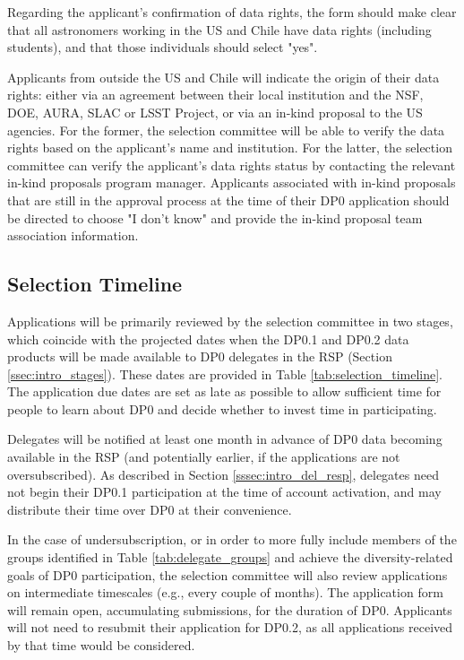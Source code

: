 \documentclass[DM,lsstdraft,authoryear,toc]{lsstdoc}
\begin{document}
Regarding the applicant's confirmation of data rights, the form should make clear that all astronomers working in the US and Chile have data rights (including students), and that those individuals should select "yes".

Applicants from outside the US and Chile will indicate the origin of their data rights: either via an agreement between their local institution and the NSF, DOE, AURA, SLAC or LSST Project, or via an in-kind proposal to the US agencies. 
For the former, the selection committee will be able to verify the data rights based on the applicant's name and institution.
For the latter, the selection committee can verify the applicant's data rights status by contacting the relevant in-kind proposals program manager.
Applicants associated with in-kind proposals that are still in the approval process at the time of their DP0 application should be directed to choose "I don't know" and provide the in-kind proposal team association information. 

\subsection{Selection Timeline}\label{ssec:sel_time}

Applications will be primarily reviewed by the selection committee in two stages, which coincide with the projected dates when the DP0.1 and DP0.2 data products will be made available to DP0 delegates in the RSP (Section \ref{ssec:intro_stages}).
These dates are provided in Table \ref{tab:selection_timeline}.
The application due dates are set as late as possible to allow sufficient time for people to learn about DP0 and decide whether to invest time in participating.

Delegates will be notified at least one month in advance of DP0 data becoming available in the RSP (and potentially earlier, if the applications are not oversubscribed).
As described in Section \ref{sssec:intro_del_resp}, delegates need not begin their DP0.1 participation at the time of account activation, and may distribute their time over DP0 at their convenience.

In the case of undersubscription, or in order to more fully include members of the groups identified in Table \ref{tab:delegate_groups} and achieve the diversity-related goals of DP0 participation, the selection committee will also review applications on intermediate timescales (e.g., every couple of months).
The application form will remain open, accumulating submissions, for the duration of DP0.
Applicants will not need to resubmit their application for DP0.2, as all applications received by that time would be considered.
\end{document}
